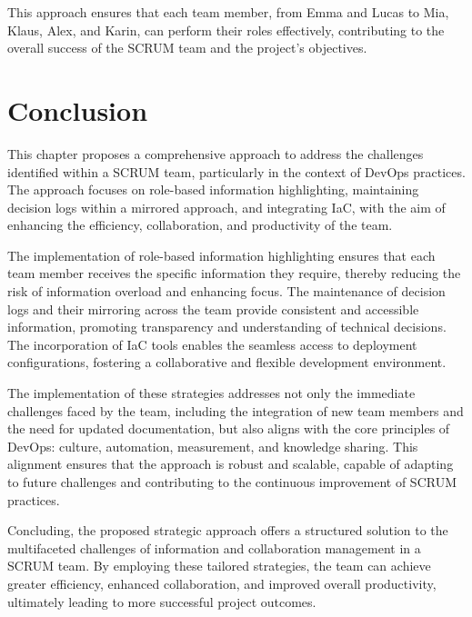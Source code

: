 This approach ensures that each team member, from Emma and Lucas to Mia, Klaus, Alex, and Karin, can perform their roles effectively, contributing to the overall success of the \ac{SCRUM} team and the project's objectives.


\section{Conclusion}
This chapter proposes a comprehensive approach to address the challenges identified within a \ac{SCRUM} team, particularly in the context of \ac{DevOps} practices. The approach focuses on role-based information highlighting, maintaining decision logs within a mirrored approach, and integrating \ac{IaC}, with the aim of enhancing the efficiency, collaboration, and productivity of the team.

The implementation of role-based information highlighting ensures that each team member receives the specific information they require, thereby reducing the risk of information overload and enhancing focus. The maintenance of decision logs and their mirroring across the team provide consistent and accessible information, promoting transparency and understanding of technical decisions. The incorporation of \ac{IaC} tools enables the seamless access to deployment configurations, fostering a collaborative and flexible development environment.  

The implementation of these strategies addresses not only the immediate challenges faced by the team, including the integration of new team members and the need for updated documentation, but also aligns with the core principles of \ac{DevOps}: culture, automation, measurement, and knowledge sharing. This alignment ensures that the approach is robust and scalable, capable of adapting to future challenges and contributing to the continuous improvement of \ac{SCRUM} practices.

Concluding, the proposed strategic approach offers a structured solution to the multifaceted challenges of information and collaboration management in a \ac{SCRUM} team. By employing these tailored strategies, the team can achieve greater efficiency, enhanced collaboration, and improved overall productivity, ultimately leading to more successful project outcomes.




